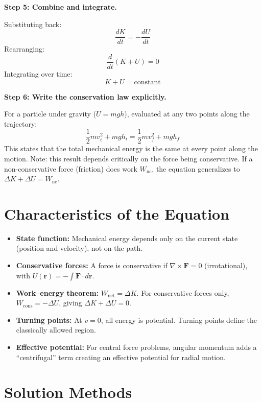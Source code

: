 \documentclass[11pt,openright]{book}
\begin{document}
\textbf{Step 5: Combine and integrate.}

Substituting back:
\begin{equation}
\frac{dK}{dt} = -\frac{dU}{dt}
\end{equation}
Rearranging:
\begin{equation}
\frac{d}{dt}(K + U) = 0
\end{equation}
Integrating over time:
\begin{equation}
K + U = \text{constant}
\end{equation}

\textbf{Step 6: Write the conservation law explicitly.}

For a particle under gravity ($U = mgh$), evaluated at any two points along the trajectory:
\begin{equation}
\boxed{\frac{1}{2}mv_i^2 + mgh_i = \frac{1}{2}mv_f^2 + mgh_f}
\end{equation}
This states that the total mechanical energy is the same at every point along the motion. Note: this result depends critically on the force being conservative. If a non-conservative force (friction) does work $W_{\text{nc}}$, the equation generalizes to $\Delta K + \Delta U = W_{\text{nc}}$.

\section*{Characteristics of the Equation}

\begin{itemize}
\item \textbf{State function:} Mechanical energy depends only on the current state (position and velocity), not on the path.
\item \textbf{Conservative forces:} A force is conservative if $\nabla \times \mathbf{F} = 0$ (irrotational), with $U(\mathbf{r}) = -\int \mathbf{F} \cdot d\mathbf{r}$.
\item \textbf{Work--energy theorem:} $W_{\text{net}} = \Delta K$. For conservative forces only, $W_{\text{cons}} = -\Delta U$, giving $\Delta K + \Delta U = 0$.
\item \textbf{Turning points:} At $v = 0$, all energy is potential. Turning points define the classically allowed region.
\item \textbf{Effective potential:} For central force problems, angular momentum adds a ``centrifugal'' term creating an effective potential for radial motion.
\end{itemize}
\section*{Solution Methods}
\end{document}
